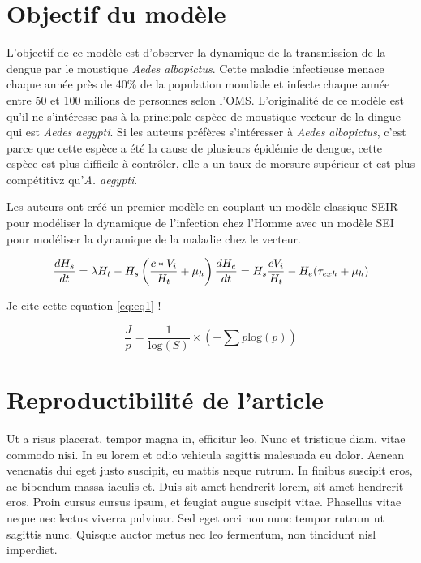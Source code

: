 \hypertarget{objectif-du-moduxe8le}{%
\section{Objectif du modèle}\label{objectif-du-moduxe8le}}

L'objectif de ce modèle est d'observer la dynamique de la transmission
de la dengue par le moustique \emph{Aedes albopictus}. Cette maladie
infectieuse menace chaque année près de 40\% de la population mondiale
et infecte chaque année entre 50 et 100 milions de personnes selon
l'OMS. L'originalité de ce modèle est qu'il ne s'intéresse pas à la
principale espèce de moustique vecteur de la dingue qui est \emph{Aedes
aegypti}. Si les auteurs préfères s'intéresser à \emph{Aedes
albopictus}, c'est parce que cette espèce a été la cause de plusieurs
épidémie de dengue, cette espèce est plus difficile à contrôler, elle a
un taux de morsure supérieur et est plus compétitivz qu'\emph{A.
aegypti}.

Les auteurs ont créé un premier modèle en couplant un modèle classique
SEIR pour modéliser la dynamique de l'infection chez l'Homme avec un
modèle SEI pour modéliser la dynamique de la maladie chez le vecteur.

\[ \frac{dH_s}{dt} = \lambda H_t - H_s \left(\frac{c*V_i}{H_t} + \mu_h\right) \\
  \frac{dH_e}{dt} = H_s \frac{cV_i}{H_t} - H_e (\tau_{exh} + \mu_h)\]

Je cite cette equation \ref{eq:eq1} !

\begin{equation} \frac{J}{p} = \frac{1}{\text{log}(S)}\times\left(-\sum p \text{log}(p)\right)\label{eq:eq1}\end{equation}

\hypertarget{reproductibilituxe9-de-larticle}{%
\section{Reproductibilité de
l'article}\label{reproductibilituxe9-de-larticle}}

Ut a risus placerat, tempor magna in, efficitur leo. Nunc et tristique
diam, vitae commodo nisi. In eu lorem et odio vehicula sagittis
malesuada eu dolor. Aenean venenatis dui eget justo suscipit, eu mattis
neque rutrum. In finibus suscipit eros, ac bibendum massa iaculis et.
Duis sit amet hendrerit lorem, sit amet hendrerit eros. Proin cursus
cursus ipsum, et feugiat augue suscipit vitae. Phasellus vitae neque nec
lectus viverra pulvinar. Sed eget orci non nunc tempor rutrum ut
sagittis nunc. Quisque auctor metus nec leo fermentum, non tincidunt
nisl imperdiet.

